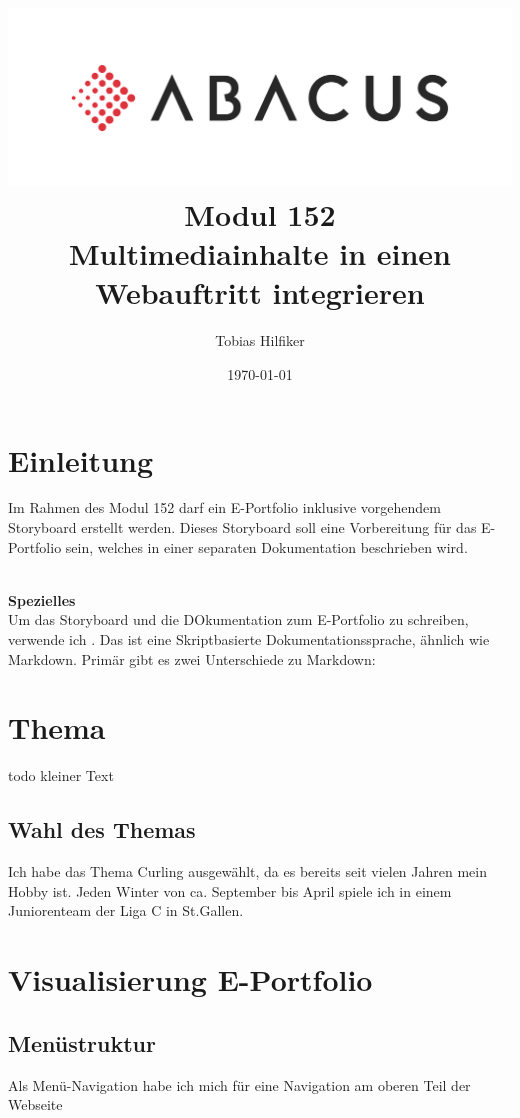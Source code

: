 \documentclass[11pt]{article}
\title{
    \includegraphics{media/frontpage.jpg}
    Modul 152 \\
    Multimediainhalte in einen Webauftritt integrieren}
\author{Tobias Hilfiker}
\date{\today}
\begin{document}
    \maketitle
    \pagebreak

    \tableofcontents
    \pagebreak

    \section{Einleitung}
    Im Rahmen des Modul 152 darf ein E-Portfolio inklusive vorgehendem Storyboard erstellt werden.
    Dieses Storyboard soll eine Vorbereitung für das E-Portfolio sein, welches in einer separaten
    Dokumentation beschrieben wird.

    \\
    \textbf{Spezielles}\\
    Um das Storyboard und die DOkumentation zum E-Portfolio zu schreiben, verwende ich \latex. Das ist
    eine Skriptbasierte Dokumentationssprache, ähnlich wie Markdown. Primär gibt es zwei Unterschiede zu
    Markdown:

    \section{Thema}

    todo kleiner Text

    \subsection{Wahl des Themas}

    Ich habe das Thema Curling ausgewählt, da es bereits seit vielen Jahren mein Hobby ist. Jeden Winter
    von ca. September bis April spiele ich in einem Juniorenteam der Liga C in St.Gallen.

    \section{Visualisierung E-Portfolio}

    \subsection{Menüstruktur}
    Als Menü-Navigation habe ich mich für eine Navigation am oberen Teil der Webseite
\end{document}
